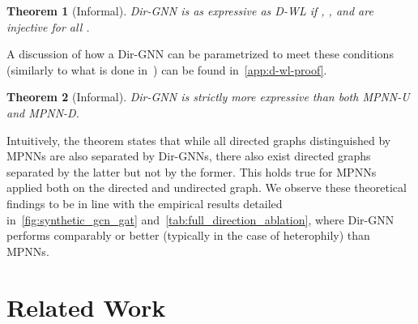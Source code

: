 \documentclass{article}
\newcommand\oursacro{Dir-GNN}
\theoremstyle{plain}
\newtheorem{theorem}{Theorem}[section]
\theoremstyle{definition}
\theoremstyle{remark}
\begin{document}
\begin{theorem}[Informal]\label{thm:dirgnn-as-expressive-as-d-wl}
    \oursacro{} is as expressive as D-WL if , , and  are injective for all . 
\end{theorem}

A discussion of how a \oursacro{} can be parametrized to meet these conditions (similarly to what is done in~\citet{DBLP:conf/iclr/XuHLJ19}) can be found in~\cref{app:d-wl-proof}.

\begin{theorem}[Informal]\label{thm:dirgnn-strictly-more-expressive-than-mpnn}
\oursacro{} is strictly more expressive than both MPNN-U and MPNN-D.
\end{theorem}

Intuitively, the theorem states that while all directed graphs distinguished by MPNNs are also separated by \oursacro{}s, there also exist directed graphs separated by the latter but not by the former. This holds true for  MPNNs applied both on the directed and undirected graph.
We observe these theoretical findings to be in line with the empirical results detailed in~\cref{fig:synthetic_gcn_gat} and~\cref{tab:full_direction_ablation}, where \oursacro{} performs comparably or better (typically in the case of heterophily) than MPNNs. \section{Related Work}
\label{sec:related_work}
\end{document}
